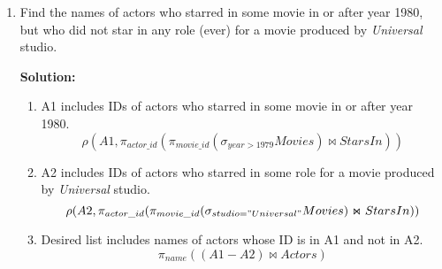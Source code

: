 \begin{enumerate}
\item Find the names of actors who starred in some movie in or after year 1980, but who did not star in any role (ever) for a movie produced by \textit{Universal} studio.

\textbf{Solution:}
\begin{enumerate}
\item A1 includes IDs of actors who starred in some movie in or after year 1980.
$$ \rho(A1,\pi_{actor\_id}(\pi_{movie\_id}(\sigma_{year>1979}Movies) \Join StarsIn)) $$
\item A2 includes IDs of actors who starred in some role for a movie produced by \textit{Universal} studio.
$$ \rho(A2,\pi_{actor\_id}(\pi_{movie\_id}(\sigma_{studio="Universal"}Movies) \Join StarsIn)) $$
\item Desired list includes names of actors whose ID is in A1 and not in A2.
$$ \pi_{name}((A1-A2)\Join Actors) $$
\end{enumerate}

\end{enumerate}

